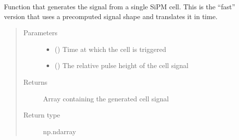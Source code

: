 \documentclass[letterpaper,10pt,english]{sphinxmanual}
\begin{document}

\begin{fulllineitems}
\label{\detokenize{structure:libs.lib.PulseCPU}}
Function that generates the signal from a single SiPM cell. This is the “fast” version that uses a pre\sphinxhyphen{}computed signal shape and translates it in time.
\begin{quote}\begin{description}
\item[{Parameters}] \leavevmode\begin{itemize}
\item {} 
 () \textendash{} Time at which the cell is triggered

\item {} 
 () \textendash{} The relative pulse height of the cell signal

\end{itemize}

\item[{Returns}] \leavevmode
{} \textendash{} Array containing the generated cell signal

\item[{Return type}] \leavevmode
np.ndarray

\end{description}\end{quote}

\end{fulllineitems}

\end{document}
